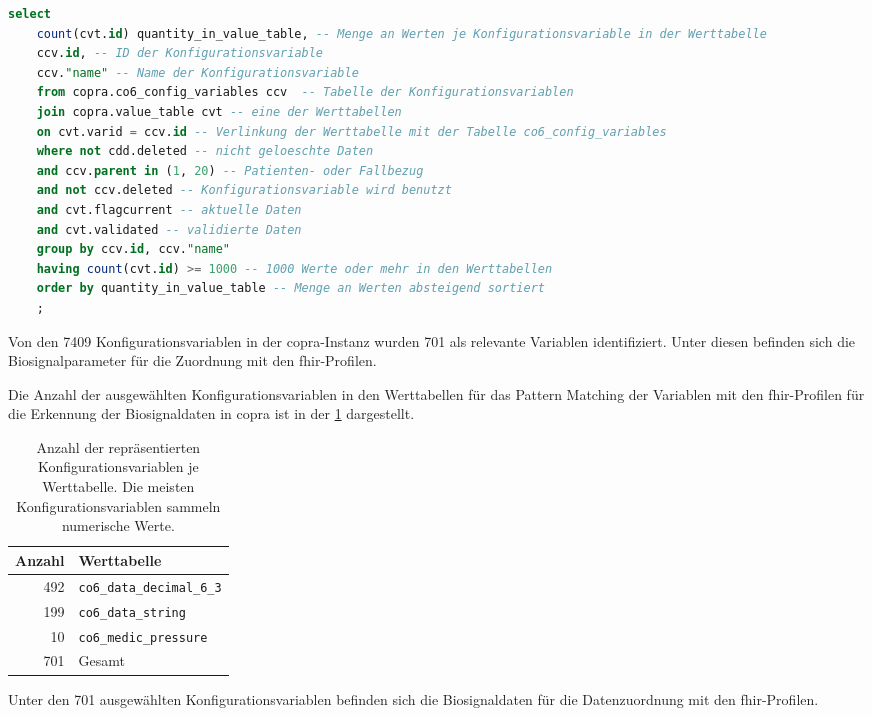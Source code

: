 \begin{lstlisting}[language=SQL, caption={[SQL-Abfrage zur Auswahl der Konfigurationsvariablen] SQL-Abfrage zur Auswahl der Konfigurationsvariablen im COPRA-System. \glqq copra.value\_table cvt\grqq{} stellt die verschiedenen Werttabellen im System dar: co6\_data\_decimal\_6\_3, co6\_data\_string und co6\_medic\_pressure. \glqq quantity\_in\_value\_table\grqq{} ist ein Alias für die Spalte der Menge an Werten in den Werttabellen.}, captionpos=b, label=list:selectconfigvar]
	select 
	count(cvt.id) quantity_in_value_table, -- Menge an Werten je Konfigurationsvariable in der Werttabelle
	ccv.id, -- ID der Konfigurationsvariable
	ccv."name" -- Name der Konfigurationsvariable
	from copra.co6_config_variables ccv  -- Tabelle der Konfigurationsvariablen 
	join copra.value_table cvt -- eine der Werttabellen
	on cvt.varid = ccv.id -- Verlinkung der Werttabelle mit der Tabelle co6_config_variables
	where not cdd.deleted -- nicht geloeschte Daten
	and ccv.parent in (1, 20) -- Patienten- oder Fallbezug
	and not ccv.deleted -- Konfigurationsvariable wird benutzt
	and cvt.flagcurrent -- aktuelle Daten
	and cvt.validated -- validierte Daten
	group by ccv.id, ccv."name" 
	having count(cvt.id) >= 1000 -- 1000 Werte oder mehr in den Werttabellen
	order by quantity_in_value_table -- Menge an Werten absteigend sortiert
	;
\end{lstlisting}

Von den 7409 Konfigurationsvariablen in der \ac{copra}-Instanz wurden 701 als relevante Variablen identifiziert. Unter diesen befinden sich die Biosignalparameter für die Zuordnung mit den \ac{fhir}-Profilen.

Die Anzahl der ausgewählten Konfigurationsvariablen in den Werttabellen für das Pattern Matching der Variablen mit den \ac{fhir}-Profilen für die Erkennung der Biosignaldaten in \ac{copra} ist in der \ref{tab:configvarvaluetables} dargestellt.

\begin{table}[ht]
	\centering  
	\caption[Anzahl der repräsentierten Konfigurationsvariablen je Werttabelle]{Anzahl der repräsentierten Konfigurationsvariablen je Werttabelle. Die meisten Konfigurationsvariablen sammeln numerische Werte.}
	
	\label{tab:configvarvaluetables}
	\begin{tabular}{|r|l|}
		\hline
		\bfseries Anzahl & \bfseries Werttabelle \\ \hline
		492 & \texttt{co6\_data\_decimal\_6\_3} \\ \hline
		199 & \texttt{co6\_data\_string} \\ \hline
		10 & \texttt{co6\_medic\_pressure} \\ \hline
		701 & Gesamt \\ \hline 
	\end{tabular}
\end{table}

Unter den 701 ausgewählten Konfigurationsvariablen befinden sich die Biosignaldaten für die Datenzuordnung mit den \ac{fhir}-Profilen.
